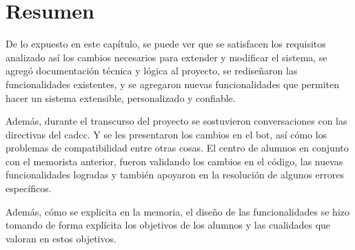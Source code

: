     


\section{Resumen}
    \par De lo expuesto en este capítulo, se puede ver que se satisfacen los requisitos analizado así los cambios necesarios para extender y modificar el sistema, se agregó documentación técnica y lógica al proyecto, se rediseñaron las funcionalidades existentes, y se agregaron nuevas funcionalidades que permiten hacer un sistema extensible, personalizado y confiable.
    \par Además, durante el transcurso del proyecto se sostuvieron conversaciones con las directivas del \acrlong{cadcc}. Y se les presentaron los cambios en el bot, así cómo los problemas de compatibilidad entre otras cosas. El centro de alumnos en conjunto con el memorista anterior, fueron validando los cambios en el código, las nuevas funcionalidades logradas y también apoyaron en la resolución de algunos errores específicos.
    \par Además, cómo se explicita en la memoria, el diseño de las funcionalidades se hizo tomando de forma explícita los objetivos de los alumnos y las cualidades que valoran en estos objetivos.